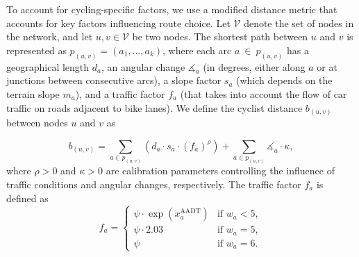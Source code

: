 \documentclass[lettersize,journal]{IEEEtran}
\begin{document}
To account for cycling-specific factors, we use a modified distance metric that accounts for key factors influencing route choice. Let $\mathcal{V}$ denote the set of nodes in the network, and let $u, v \in \mathcal{V}$ be two nodes. The shortest path between $u$ and $v$ is represented as $p_{(u,v)} = (a_{1},\ldots, a_{k})$, where each arc $a~\in~p_{(u,v)}$ has a geographical length $d_{a}$, an angular change $\measuredangle_a$ (in degrees, either along $a$ or at junctions between consecutive arcs), a slope factor $s_{a}$ (which depends on the terrain slope $m_{a}$), and a traffic factor $f_{a}$ (that takes into account the flow of car traffic on roads adjacent to bike lanes). We define the cyclist distance $b_{(u,v)}$ between nodes $u$ and $v$ as

\begin{equation}
\label{cyclist_distance}
    b_{(u,v)} = \sum_{a \in p_{(u,v)}} \left( d_a \cdot s_a \cdot (f_a)^{\rho} \right) +  \sum_{a \in p_{(u,v)}} \measuredangle_a \cdot \kappa,
\end{equation}
where $\rho > 0$ and $\kappa > 0$ are calibration parameters controlling the influence of traffic conditions and angular changes, respectively.
The traffic factor $f_a$ is defined as
\begin{equation}
\label{f_a}
f_a = 
     \begin{cases}
\psi \cdot \exp{\left( x^{\text{AADT}}_{a} \right)} & \text{if } w_a < 5, \\
\psi \cdot 2.03 & \text{if } w_a = 5, \\
\psi & \text{if } w_a = 6.
\end{cases}
\end{equation}
\end{document}
